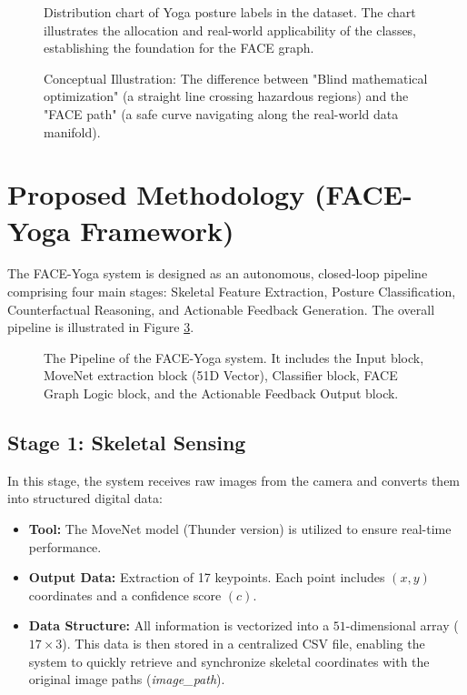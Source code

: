 \documentclass[pdflatex,sn-mathphys-num]{sn-jnl}%
\theoremstyle{thmstyleone}%
\theoremstyle{thmstyletwo}%
\theoremstyle{thmstylethree}%
\begin{document}
\begin{figure}[h]
\centering
\caption{Distribution chart of Yoga posture labels in the dataset. The chart illustrates the allocation and real-world applicability of the classes, establishing the foundation for the FACE graph.}\label{fig:distribution}
\end{figure}

\begin{figure}[h]
\centering
\caption{Conceptual Illustration: The difference between "Blind mathematical optimization" (a straight line crossing hazardous regions) and the "FACE path" (a safe curve navigating along the real-world data manifold).}\label{fig:face_concept}
\end{figure}

\section{Proposed Methodology (FACE-Yoga Framework)}\label{sec:methodology}

The FACE-Yoga system is designed as an autonomous, closed-loop pipeline comprising four main stages: Skeletal Feature Extraction, Posture Classification, Counterfactual Reasoning, and Actionable Feedback Generation. The overall pipeline is illustrated in Figure \ref{fig:pipeline}.

\begin{figure}[h]
\centering
\caption{The Pipeline of the FACE-Yoga system. It includes the Input block, MoveNet extraction block (51D Vector), Classifier block, FACE Graph Logic block, and the Actionable Feedback Output block.}\label{fig:pipeline}
\end{figure}

\subsection{Stage 1: Skeletal Sensing}
In this stage, the system receives raw images from the camera and converts them into structured digital data:
\begin{itemize}
    \item \textbf{Tool:} The MoveNet model (Thunder version) is utilized to ensure real-time performance.
    \item \textbf{Output Data:} Extraction of 17 keypoints. Each point includes $(x, y)$ coordinates and a confidence score $(c)$.
    \item \textbf{Data Structure:} All information is vectorized into a $51$-dimensional array ($17 \times 3$). This data is then stored in a centralized CSV file, enabling the system to quickly retrieve and synchronize skeletal coordinates with the original image paths (\textit{image\_path}).
\end{itemize}
\end{document}
